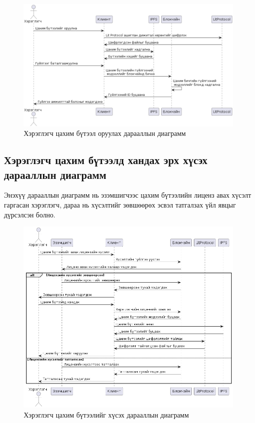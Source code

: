 \begin{figure}[h!]
	\centering
	\includegraphics[scale=0.28]{src/images/sequence.png}
	\caption{Хэрэглэгч цахим бүтээл оруулах дарааллын диаграмм}
\end{figure}

\pagebreak
\subsection{Хэрэглэгч цахим бүтээлд хандах эрх хүсэх дарааллын диаграмм}
Энэхүү дарааллын диаграмм нь эзэмшигчээс цахим бүтээлийн лиценз авах хүсэлт гаргасан хэрэглэгч, дараа нь хүсэлтийг зөвшөөрөх эсвэл татгалзах үйл явцыг дүрсэлсэн болно.
\begin{figure}[h!]
	\centering
	\includegraphics[scale=0.6,]{src/images/sequence-2.png}
	\caption{Хэрэглэгч цахим бүтээлийг хүсэх дарааллын диаграмм}
\end{figure}

